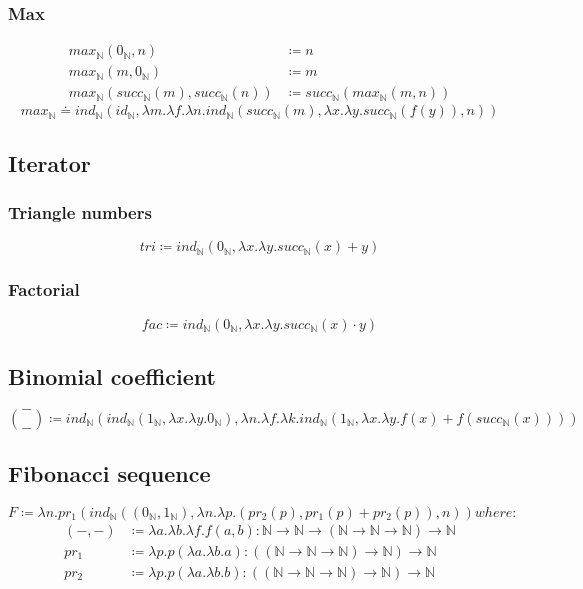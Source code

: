 \documentclass{article}
\begin{document}
\subsubsection{Max}
\begin{align}
    max_{\mathbb{N}}(0_{\mathbb{N}}, n) &\coloneqq n \\
    max_{\mathbb{N}}(m,0_{\mathbb{N}}) &\coloneqq m\\
    max_{\mathbb{N}}(succ_{\mathbb{N}}(m), succ_{\mathbb{N}}(n)) &\coloneqq succ_{\mathbb{N}}(max_{\mathbb{N}}(m,n))
\end{align}
$$
    max_{\mathbb{N}} \doteq ind_{\mathbb{N}}(id_{\mathbb{N}},\lambda m.\lambda f.\lambda n.ind_{\mathbb{N}}(succ_{\mathbb{N}}(m), \lambda x.\lambda y.succ_{\mathbb{N}}(f(y)),n))
$$
\subsection{Iterator}
\subsubsection{Triangle numbers}
$$
    tri \coloneqq ind_{\mathbb{N}}(0_{\mathbb{N}}, \lambda x.\lambda y.succ_{\mathbb{N}}(x) + y)
$$
\subsubsection{Factorial}
$$
    fac \coloneqq ind_{\mathbb{N}}(0_{\mathbb{N}}, \lambda x.\lambda y.succ_{\mathbb{N}}(x) \cdot y)
$$
\subsection{Binomial coefficient}
$$
    \binom{-}{-} \coloneqq ind_{\mathbb{N}}(ind_{\mathbb{N}}(1_{\mathbb{N}},\lambda x.\lambda y.0_{\mathbb{N}}), \lambda n.\lambda f.\lambda k.ind_{\mathbb{N}}(1_{\mathbb{N}}, \lambda x.\lambda y.f(x) + f(succ_{\mathbb{N}}(x))))
$$
\subsection{Fibonacci sequence}
$$
    F \coloneqq \lambda n.pr_1(ind_{\mathbb{N}}((0_{\mathbb{N}},1_{\mathbb{N}}), \lambda n.\lambda p.(pr_2(p),pr_1(p) + pr_2(p)),n)) \mathrel{where:}
$$
\begin{align}
    (-,-) &\coloneqq \lambda a.\lambda b.\lambda f. f(a,b):\mathbb{N} \to \mathbb{N} \to (\mathbb{N} \to \mathbb{N} \to \mathbb{N}) \to \mathbb{N}\\
    pr_1 &\coloneqq \lambda p.p(\lambda a.\lambda b.a):((\mathbb{N} \to \mathbb{N} \to \mathbb{N}) \to \mathbb{N}) \to \mathbb{N}\\
    pr_2 &\coloneqq \lambda p.p(\lambda a.\lambda b.b):((\mathbb{N} \to \mathbb{N} \to \mathbb{N}) \to \mathbb{N}) \to \mathbb{N}
\end{align}
\end{document}
